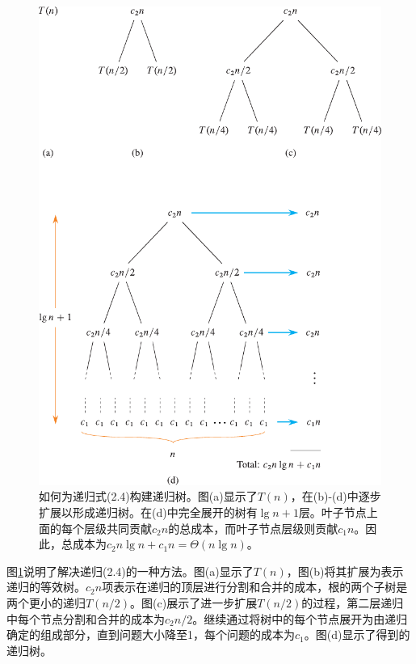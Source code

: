\documentclass[lang=cn,newtx,10pt,scheme=chinese]{elegantbook}
\begin{document}
\begin{figure}[htbp]
    \centering
    \includegraphics{算法导论第四版插图/第二章/归并排序的递归树示意图.pdf}
    \caption{如何为递归式(2.4)构建递归树。图(a)显示了$T(n)$，在(b)-(d)中逐步扩展以形成递归树。在(d)中完全展开的树有$\lg n + 1$层。叶子节点上面的每个层级共同贡献$c_2n$的总成本，而叶子节点层级则贡献$c_1n$。因此，总成本为$c_2 n \lg n+c_1 n=\Theta(n \lg n)$。}
    \label{fig:归并排序的递归树示意图}
\end{figure}

图\ref{fig:归并排序的递归树示意图}说明了解决递归(2.4)的一种方法。图(a)显示了$T(n)$，图(b)将其扩展为表示递归的等效树。$c_2n$项表示在递归的顶层进行分割和合并的成本，根的两个子树是两个更小的递归$T(n/2)$。图(c)展示了进一步扩展$T(n/2)$的过程，第二层递归中每个节点分割和合并的成本为$c_2 n/2$。继续通过将树中的每个节点展开为由递归确定的组成部分，直到问题大小降至1，每个问题的成本为$c_1$。图(d)显示了得到的递归树。
\end{document}
